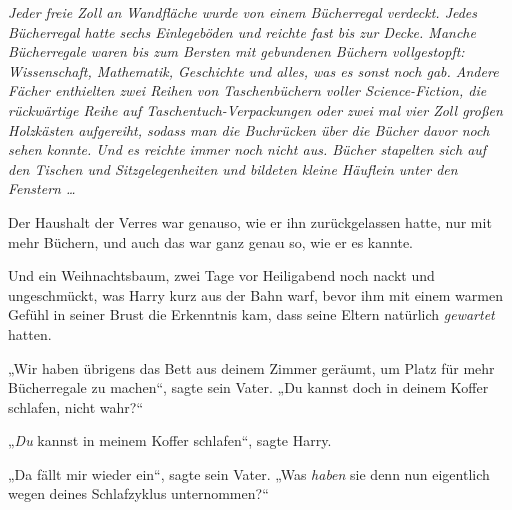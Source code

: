 \emph{Jeder freie Zoll an Wandfläche wurde von einem Bücherregal verdeckt. Jedes Bücherregal hatte sechs Einlegeböden und reichte fast bis zur Decke. Manche Bücherregale waren bis zum Bersten mit gebundenen Büchern vollgestopft: Wissenschaft, Mathematik, Geschichte und alles, was es sonst noch gab. Andere Fächer enthielten zwei Reihen von Taschenbüchern voller Science-Fiction, die rückwärtige Reihe auf Taschentuch-Verpackungen oder zwei mal vier Zoll großen Holzkästen aufgereiht, sodass man die Buchrücken über die Bücher davor noch sehen konnte. Und es reichte immer noch nicht aus. Bücher stapelten sich auf den Tischen und Sitzgelegenheiten und bildeten kleine Häuflein unter den Fenstern …}

Der Haushalt der Verres war genauso, wie er ihn zurückgelassen hatte, nur mit mehr Büchern, und auch das war ganz genau so, wie er es kannte.

Und ein Weihnachtsbaum, zwei Tage vor Heiligabend noch nackt und ungeschmückt, was Harry kurz aus der Bahn warf, bevor ihm mit einem warmen Gefühl in seiner Brust die Erkenntnis kam, dass seine Eltern natürlich \emph{gewartet} hatten.

„Wir haben übrigens das Bett aus deinem Zimmer geräumt, um Platz für mehr Bücherregale zu machen“, sagte sein Vater.
„Du kannst doch in deinem Koffer schlafen, nicht wahr?“

„\emph{Du} kannst in meinem Koffer schlafen“, sagte Harry.

„Da fällt mir wieder ein“, sagte sein Vater.
„Was \emph{haben} sie denn nun eigentlich wegen deines Schlafzyklus unternommen?“

